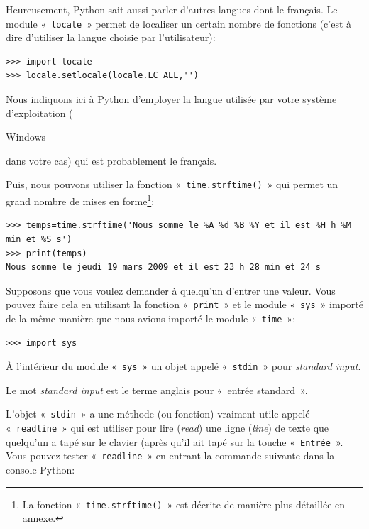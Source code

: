 Heureusement, Python sait aussi parler d'autres langues dont le français. Le module «~\texttt{locale}~» permet de localiser un certain nombre de fonctions (c'est à dire d'utiliser la langue choisie par l'utilisateur):

\begin{Verbatim}[frame=single,rulecolor=\color{mbleu}, label=à taper]
>>> import locale
>>> locale.setlocale(locale.LC_ALL,'')
\end{Verbatim}

Nous indiquons ici à Python d'employer la langue utilisée par votre système d'exploitation (\begin{WINDOWS}Windows\end{WINDOWS} dans votre cas) qui est probablement le français.

Puis, nous pouvons utiliser la fonction «~\texttt{time.strftime()}~» qui permet un grand nombre de mises en forme\footnote{La fonction «~\texttt{time.strftime()}~» est décrite de manière plus détaillée en annexe.}:

\begin{small}
\begin{Verbatim}[frame=single,rulecolor=\color{mbleu}, label=à taper]
>>> temps=time.strftime('Nous somme le %A %d %B %Y et il est %H h %M min et %S s')
>>> print(temps)
Nous somme le jeudi 19 mars 2009 et il est 23 h 28 min et 24 s
\end{Verbatim}
\end{small}

Supposons que vous voulez demander à quelqu'un d'entrer une valeur. Vous pouvez faire cela en utilisant la fonction
«~\texttt{print}~» et le module «~\texttt{sys}~» importé de la même manière que nous avions importé le module «~\texttt{time}~»: 

\begin{Verbatim}[frame=single,rulecolor=\color{mbleu}, label=à taper]
>>> import sys
\end{Verbatim}

À l'intérieur du module «~\texttt{sys}~» un objet appelé «~\texttt{stdin}~» pour \emph{standard input}.

Le mot \emph{standard input} est le terme anglais pour «~entrée standard~».

L'objet «~\texttt{stdin}~» a une méthode (ou fonction) vraiment utile appelé  «~\texttt{readline}~» qui est utiliser pour lire (\emph{read}) une ligne (\emph{line}) de texte que quelqu'un a tapé sur le clavier (après qu'il ait tapé sur la touche «~\texttt{Entrée}~». Vous pouvez tester «~\texttt{readline}~» en entrant la commande suivante dans la console Python:


